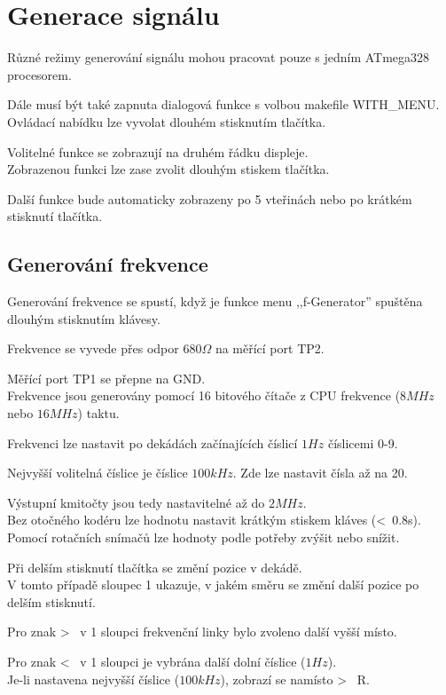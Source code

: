 \chapter{Generace signálu}

Různé režimy generování signálu mohou pracovat pouze s jedním ATmega328 procesorem.

Dále musí být také zapnuta dialogová funkce s volbou makefile WITH\_MENU.
\\Ovládací nabídku lze vyvolat dlouhém stisknutím tlačítka.

Volitelné funkce se zobrazují na druhém řádku displeje.
\\Zobrazenou funkci lze zase zvolit dlouhým stiskem tlačítka.

Další funkce bude automaticky zobrazeny po 5 vteřinách nebo po krátkém stisknutí tlačítka.
\label{sec:generation}

\section{Generování frekvence}

Generování frekvence se spustí, když je funkce menu ,,f-Generator'' spuštěna dlouhým stisknutím klávesy.

Frekvence se vyvede přes odpor \(680\Omega\) na měřící port TP2.

Měřící port TP1 se přepne na GND.
\\Frekvence jsou generovány pomocí 16 bitového čítače z CPU frekvence (\(8MHz\) nebo \(16MHz\)) taktu.

Frekvenci lze nastavit po dekádách začínajících číslicí \(1Hz\) číslicemi 0-9.

Nejvyšší volitelná číslice je číslice \(100kHz\). Zde lze nastavit čísla až na 20.

Výstupní kmitočty jsou tedy nastavitelné až do \(2MHz\).
\\Bez otočného kodéru lze hodnotu nastavit krátkým stiskem kláves (\textless~0.8s).
\\Pomocí rotačních snímačů lze hodnoty podle potřeby zvýšit nebo snížit.

Při delším stisknutí tlačítka se změní pozice v dekádě.
\\V tomto případě sloupec 1 ukazuje, v jakém směru se změní další pozice po delším stisknutí.

Pro znak \textgreater~ v 1 sloupci frekvenční linky bylo zvoleno další vyšší místo.

Pro znak \textless~ v 1 sloupci je vybrána další dolní číslice (\(1Hz\)).
\\Je-li nastavena nejvyšší číslice (\(100kHz\)), zobrazí se namísto \textgreater~ R.

